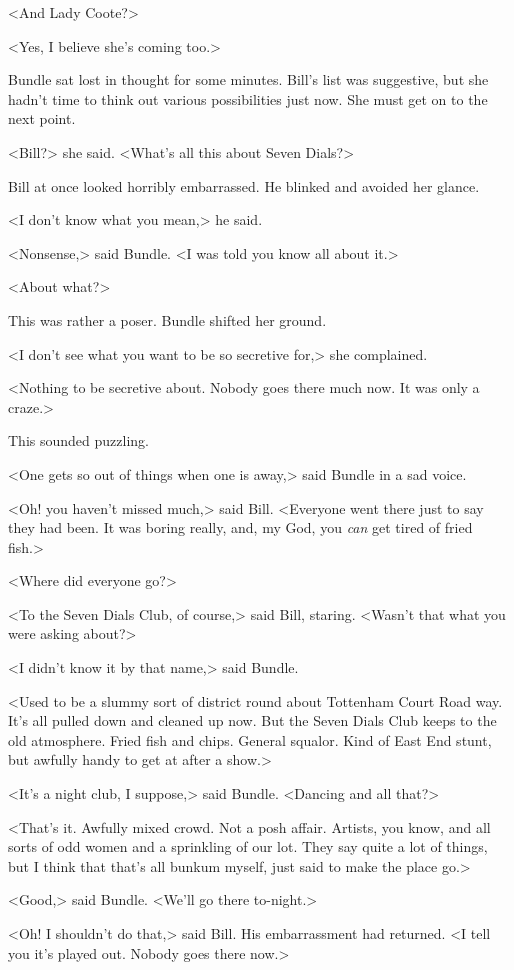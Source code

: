 <And Lady Coote?>

<Yes, I believe she's coming too.>

Bundle sat lost in thought for some minutes. Bill's list was suggestive, but she hadn't time to think out various possibilities just now. She must get on to the next point.

<Bill?> she said. <What's all this about Seven Dials?>

Bill at once looked horribly embarrassed. He blinked and avoided her glance.

<I don't know what you mean,> he said.

<Nonsense,> said Bundle. <I was told you know all about it.>

<About what?>

This was rather a poser. Bundle shifted her ground.

<I don't see what you want to be so secretive for,> she complained.

<Nothing to be secretive about. Nobody goes there much now. It was only a craze.>

This sounded puzzling.

<One gets so out of things when one is away,> said Bundle in a sad voice.

<Oh! you haven't missed much,> said Bill. <Everyone went there just to say they had been. It was boring really, and, my God, you \emph{can} get tired of fried fish.>

<Where did everyone go?>

<To the Seven Dials Club, of course,> said Bill, staring. <Wasn't that what you were asking about?>

<I didn't know it by that name,> said Bundle.

<Used to be a slummy sort of district round about Tottenham Court Road way. It's all pulled down and cleaned up now. But the Seven Dials Club keeps to the old atmosphere. Fried fish and chips. General squalor. Kind of East End stunt, but awfully handy to get at after a show.>

<It's a night club, I suppose,> said Bundle. <Dancing and all that?>

<That's it. Awfully mixed crowd. Not a posh affair. Artists, you know, and all sorts of odd women and a sprinkling of our lot. They say quite a lot of things, but I think that that's all bunkum myself, just said to make the place go.>

<Good,> said Bundle. <We'll go there to-night.>

<Oh! I shouldn't do that,> said Bill. His embarrassment had returned. <I tell you it's played out. Nobody goes there now.>

